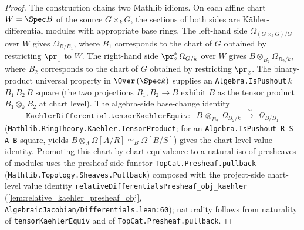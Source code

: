 \begin{proof}
  The construction chains two Mathlib idioms. On each affine chart \(W = \Spec B\) of the source \(G \times_{k} G\), the sections of both sides are Kähler-differential modules with appropriate base rings. The left-hand side \(\Omega_{(G \times_{k} G)/G}\) over \(W\) gives \(\Omega_{B/B_{1}}\), where \(B_{1}\) corresponds to the chart of \(G\) obtained by restricting \(\pr_{1}\) to \(W\). The right-hand side \(\pr_{2}^{*}\,\Omega_{G/k}\) over \(W\) gives \(B \otimes_{B_{2}} \Omega_{B_{2}/k}\), where \(B_{2}\) corresponds to the chart of \(G\) obtained by restricting \(\pr_{2}\). The binary-product universal property in \(\Over\,(\Spec k)\) supplies an \texttt{Algebra.IsPushout}\,\(k\)\,\(B_{1}\)\,\(B_{2}\)\,\(B\) square (the two projections \(B_{1}, B_{2} \to B\) exhibit \(B\) as the tensor product \(B_{1} \otimes_{k} B_{2}\) at chart level). The algebra-side base-change identity
  \[
    \texttt{KaehlerDifferential.tensorKaehlerEquiv} \colon \;\; B \,\otimes_{B_{2}}\, \Omega_{B_{2}/k} \;\xrightarrow{\;\sim\;}\; \Omega_{B/B_{1}}
  \]
  (\texttt{Mathlib.RingTheory.Kaehler.TensorProduct}; for an \texttt{Algebra.IsPushout R S A B} square, yields \(B \otimes_{A} \Omega[A/R] \simeq_{B} \Omega[B/S]\)) gives the chart-level value identity. Promoting this chart-by-chart equivalence to a natural iso of presheaves of modules uses the presheaf-side functor \texttt{TopCat.Presheaf.pullback} (\texttt{Mathlib.Topology.Sheaves.Pullback}) composed with the project-side chart-level value identity \texttt{relativeDifferentialsPresheaf\_obj\_kaehler} (\cref{lem:relative_kaehler_presheaf_obj}, \texttt{AlgebraicJacobian/Differentials.lean:60}); naturality follows from naturality of \texttt{tensorKaehlerEquiv} and of \texttt{TopCat.Presheaf.pullback}.


\end{proof}
